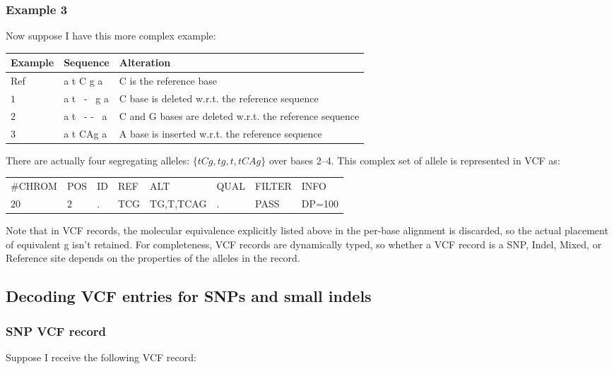 \documentclass[8pt]{article}
\begin{document}
\subsubsection{Example 3}
Now suppose I have this more complex example:

\vspace{0.3cm}
\begin{tabular}{ | l | l | l | }
\hline
Example & Sequence & Alteration \\ \hline
Ref & a t C g a & C is the reference base \\ \hline
$1$   & a t \ - \ g a & C base is deleted w.r.t. the reference sequence \\ \hline
$2$   & a t \ - - \ a & C and G bases are deleted w.r.t. the reference sequence\\ \hline
$3$   & a t CAg a & A base is inserted w.r.t. the reference sequence \\ \hline
\end{tabular}

\vspace{0.3cm}
There are actually four segregating alleles: $\{tCg,tg,t,tCAg\}$ over bases 2--4.
This complex set of allele is represented in VCF as:

\vspace{0.3cm}
\begin{tabular}{ l l l l l l l l}
	\#CHROM & POS & ID & REF & ALT & QUAL & FILTER & INFO \\
	$20$ & $2$ & . & TCG & TG,T,TCAG & . & PASS & DP=100 \\
\end{tabular}
\vspace{0.3cm}

Note that in VCF records, the molecular equivalence explicitly listed above in the per-base alignment is discarded, so the actual placement of equivalent g isn't retained.
For completeness, VCF records are dynamically typed, so whether a VCF record is a SNP, Indel, Mixed, or Reference site depends on the properties of the alleles in the record.

\subsection{Decoding VCF entries for SNPs and small indels}
\subsubsection{SNP VCF record}
Suppose I receive the following VCF record:
\end{document}
